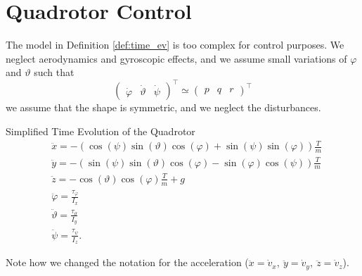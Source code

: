 \documentclass[10pt, a4paper]{report}
\begin{document}
\section{Quadrotor Control}
The model in Definition \ref{def:time_ev} is too complex for control purposes. We neglect aerodynamics and gyroscopic effects, and we assume small variations of $\varphi$ and $\vartheta$ such that\begin{equation}
    \begin{pmatrix}
        \dot\varphi&\dot\vartheta&\dot\psi
    \end{pmatrix}^\top\simeq \begin{pmatrix}
        p&q&r
    \end{pmatrix}^\top
\end{equation}
we assume that the shape is symmetric, and we neglect the disturbances.
\begin{boxdefinition}{Simplified Time Evolution of the Quadrotor}{}
    \begin{align}
& \ddot{x} = -(\cos(\psi) \sin(\vartheta) \cos(\varphi) + \sin(\psi) \sin(\varphi)) \frac{T}{m} \label{ddotx_quadrotor} \\
& \ddot{y} = -(\sin(\psi) \sin(\vartheta) \cos(\varphi) - \sin(\varphi) \cos(\psi)) \frac{T}{m} \label{ddoty_quadrotor} \\
& \ddot{z} = - \cos(\vartheta) \cos(\varphi) \frac{T}{m} + g \label{ddotz_quadrotor} \\
& \ddot{\varphi} = \frac{\tau_\varphi}{I_x} \\
& \ddot{\vartheta} = \frac{\tau_\vartheta}{I_y} \\
& \ddot{\psi} = \frac{\tau_\psi}{I_z}.
\end{align}
\end{boxdefinition}
\noindent Note how we changed the notation for the acceleration ($\ddot x=\dot v_x,\ \ddot y=\dot v_y,\ \ddot z=\dot v_z$).
\end{document}
